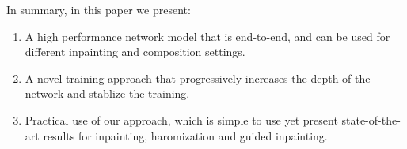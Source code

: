 \documentclass[runningheads]{llncs}
\begin{document}
In summary, in this paper we present:
\begin{enumerate}
\item A high performance network model that is end-to-end, and can be used for different inpainting and composition settings. 
\item A novel training approach that progressively increases the depth of the network and stablize the training.
\item Practical use of our approach, which is simple to use yet present state-of-the-art results for inpainting, haromization and guided inpainting.
\end{enumerate}



\clearpage



\end{document}
